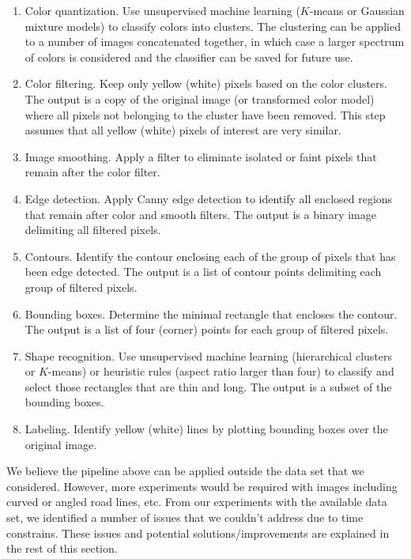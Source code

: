\documentclass{m2pi}
\begin{document}
\begin{enumerate}
    \item Color quantization. Use unsupervised machine learning ($K$-means or Gaussian mixture models) to classify colors into clusters. The clustering can be applied to a number of images concatenated together, in which case a larger spectrum of colors is considered and the classifier can be saved for future use.
    \item Color filtering. Keep only yellow (white) pixels based on the color clusters. The output is a copy of the original image (or transformed color model) where all pixels not belonging to the cluster have been removed.  This step assumes that all yellow (white) pixels of interest are very similar. 
    \item Image smoothing. Apply a filter to eliminate isolated or faint pixels that remain after the color filter.
    \item Edge detection. Apply Canny edge detection to identify all enclosed regions that remain after color and smooth filters. The output is a binary image delimiting all filtered pixels.
    \item Contours. Identify the contour enclosing each of the group of pixels that has been edge detected. The output is a list of contour points delimiting each group of filtered pixels.
    \item Bounding boxes. Determine the minimal rectangle that encloses the contour. The output is a list of four (corner) points for each group of filtered pixels.
    \item Shape recognition. Use unsupervised machine learning (hierarchical clusters or $K$-means) or heuristic rules (aspect ratio larger than four) to classify and select those rectangles that are thin and long. The output is a subset of the bounding boxes.
    \item Labeling. Identify yellow (white) lines by plotting bounding boxes over the original image.
\end{enumerate}

We believe the pipeline above can be applied outside the data set that we considered. However, more experiments would be required with images including curved or angled road lines, etc.  From our experiments with the available data set, we identified a number of issues that we couldn't address due to time constrains. These issues and potential solutions/improvements are explained in the rest of this section.
\end{document}
